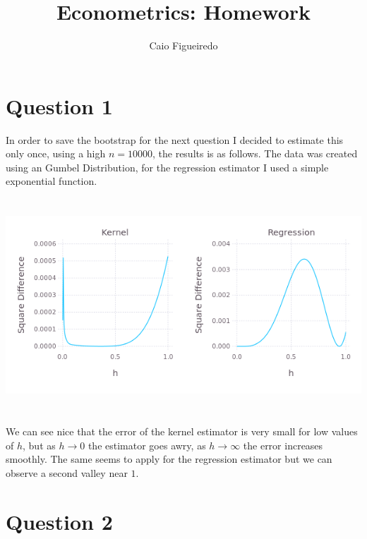 \documentclass{article}
\title{Econometrics: Homework} %
\author{Caio Figueiredo} %
\begin{document}
\maketitle %


\section{Question 1}

In order to save the bootstrap for the next question I decided to estimate
this only once, using a high $n = 10000$, the results is as follows. The data
was created using an Gumbel Distribution, for the regression estimator I used
a simple exponential function.

\begin{center}
\includegraphics[width=16cm, height=8cm]{Q1.png}
\end{center}

We can see nice that the error of the kernel estimator is very small for
low values of $h$, but as $h \rightarrow 0$ the estimator goes awry, as 
$h \rightarrow \infty$ the error increases smoothly. The same seems to
apply for the regression estimator but we can observe a second valley near $1$.



\section{Question 2}
\end{document}
